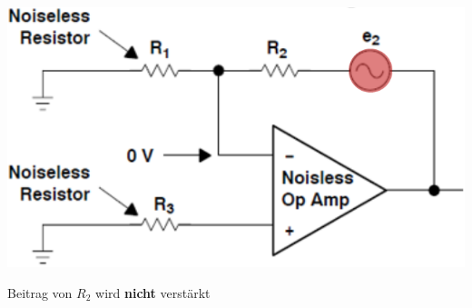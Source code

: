 \begin{minipage}[c]{0.4\columnwidth}
    \includegraphics[width=\columnwidth]{images/rauschen_opamp_R2.png}
\end{minipage}
\hfill
\begin{minipage}[c]{0.58\columnwidth}
    Beitrag von $R_2$ wird \textbf{nicht} verstärkt 

\end{minipage}


